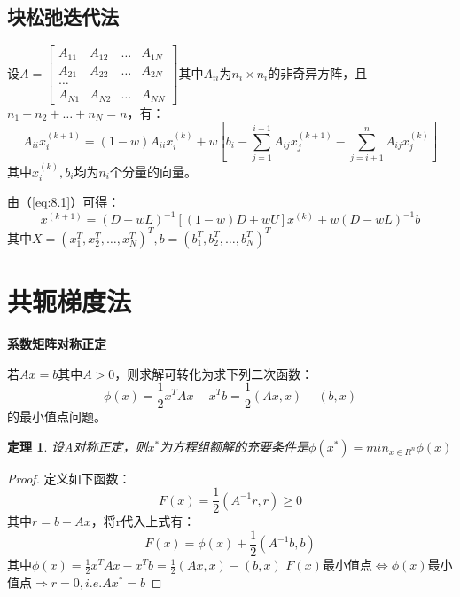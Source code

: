 \documentclass[a4paper]{article}
\newtheorem{theorem}{定理}[section]
\begin{document}
\subsection{块松弛迭代法}
设$A=\left[\begin{matrix}
  A_{11} & A_{12} & \dots & A_{1N} \\
  A_{21} & A_{22} & \dots & A_{2N} \\
  \dots \\
  A_{N1} & A_{N2} & \dots & A_{NN}
\end{matrix}\right]$其中$A_{ii}$为$n_i\times n_i $的非奇异方阵，且$n_1+n_2+\dots+n_N=n$，有：
\begin{equation}
  A_{ii}x_i^{(k+1)} = (1-w)A_{ii}x_i^{(k)}+w[b_i-\sum^{i-1}_{j=1}A_{ij}x^{(k+1)}_j-\sum^n_{j=i+1}A_{ij}x^{(k)}_j]
  \label{eq:8.1}
\end{equation}
其中$x_i^{(k)}, b_i$均为$n_i$个分量的向量。

由（\ref{eq:8.1}）可得：
$$x^{(k+1)}=(D-wL)^{-1}[(1-w)D+wU]x^{(k)}+w(D-wL)^{-1}b $$
其中$X=(x_1^T, x_2^T, \dots, x^T_N)^T, b=(b_1^T, b_2^T, \dots, b_N^T)^T$

\section{共轭梯度法}
\textbf{系数矩阵对称正定}

若$Ax=b$其中$A>0$，则求解可转化为求下列二次函数：
\begin{equation}
  \phi(x)=\frac{1}{2}x^TAx-x^Tb=\frac{1}{2}(Ax,x)-(b,x) 
\end{equation}
的最小值点问题。

\begin{theorem}
  设A对称正定，则$x^*$为方程组额解的充要条件是$\phi(x^*)=min_{x\in R^n}\phi(x) $
\end{theorem}
\begin{proof}
  定义如下函数：
  $$F(x)=\frac{1}{2}(A^{-1}r, r)\ge 0 $$
  其中$r=b-Ax$，将r代入上式有：
  $$F(x)=\phi(x)+\frac{1}{2}(A^{-1}b,b) $$
  其中$\phi(x)=\frac{1}{2}x^TAx-x^Tb=\frac{1}{2}(Ax,x)-(b,x) $
  $F(x)$最小值点$\Leftrightarrow$$\phi(x)$最小值点$\Rightarrow r=0, i.e. Ax^*=b$
\end{proof}
\end{document}
